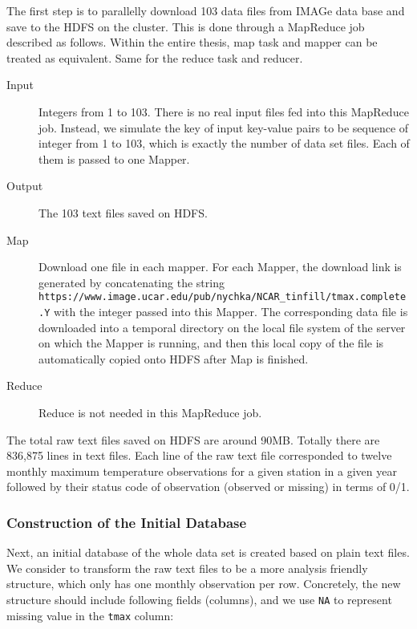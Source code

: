 The first step is to parallelly download 103 data files from IMAGe data base and 
save to the HDFS on the cluster. This is done through a MapReduce job described 
as follows. Within the entire thesis, map task and mapper can be treated as 
equivalent. Same for the reduce task
and reducer.
\begin{description}
  \item[Input] Integers from 1 to 103. There is no real input files fed into this
  MapReduce job. Instead, we simulate the key of input key-value pairs to be
  sequence of integer from 1 to 103, which is exactly the number of data set files. 
  Each of them is passed to one Mapper. 
  \item[Output] The 103 text files saved on HDFS.
  \item[Map] Download one file in each mapper. For each Mapper, the download link
  is generated by concatenating the string\\
  \texttt{https://www.image.ucar.edu/pub/nychka/NCAR\_tinfill/tmax.complete.Y}
  with the integer passed into this Mapper. The corresponding data file is
  downloaded into a temporal directory on the local file system of the server on 
  which the Mapper is running, and then this local copy of the file is automatically 
  copied onto HDFS after Map is finished.  
  \item[Reduce] Reduce is not needed in this MapReduce job.
\end{description}
The total raw text files saved on HDFS are around 90MB. Totally there are 836,875 
lines in text files. Each line of the raw text file corresponded to twelve
monthly maximum temperature observations for a given station in a given year
followed by their status code of observation (observed or missing) in terms of 0/1.

\subsubsection{Construction of the Initial Database}

Next, an initial database of the whole data set is created based on plain text
files. We consider to transform the raw text files to be a more
analysis friendly structure, which only has one monthly observation per row. 
Concretely, the new structure should include following fields (columns), and we 
use \texttt{NA} to represent missing value in the \texttt{tmax} column:

